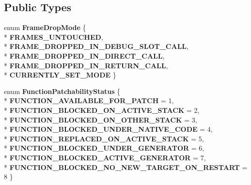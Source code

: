 \subsection*{Public Types}
\begin{DoxyCompactItemize}
\item 
enum {\bfseries Frame\+Drop\+Mode} \{ \\*
{\bfseries F\+R\+A\+M\+E\+S\+\_\+\+U\+N\+T\+O\+U\+C\+H\+ED}, 
\\*
{\bfseries F\+R\+A\+M\+E\+\_\+\+D\+R\+O\+P\+P\+E\+D\+\_\+\+I\+N\+\_\+\+D\+E\+B\+U\+G\+\_\+\+S\+L\+O\+T\+\_\+\+C\+A\+LL}, 
\\*
{\bfseries F\+R\+A\+M\+E\+\_\+\+D\+R\+O\+P\+P\+E\+D\+\_\+\+I\+N\+\_\+\+D\+I\+R\+E\+C\+T\+\_\+\+C\+A\+LL}, 
\\*
{\bfseries F\+R\+A\+M\+E\+\_\+\+D\+R\+O\+P\+P\+E\+D\+\_\+\+I\+N\+\_\+\+R\+E\+T\+U\+R\+N\+\_\+\+C\+A\+LL}, 
\\*
{\bfseries C\+U\+R\+R\+E\+N\+T\+L\+Y\+\_\+\+S\+E\+T\+\_\+\+M\+O\+DE}
 \}\hypertarget{classv8_1_1internal_1_1_live_edit_a724dd57efc0973924e2a4e2201c1285d}{}\label{classv8_1_1internal_1_1_live_edit_a724dd57efc0973924e2a4e2201c1285d}

\item 
enum {\bfseries Function\+Patchability\+Status} \{ \\*
{\bfseries F\+U\+N\+C\+T\+I\+O\+N\+\_\+\+A\+V\+A\+I\+L\+A\+B\+L\+E\+\_\+\+F\+O\+R\+\_\+\+P\+A\+T\+CH} = 1, 
\\*
{\bfseries F\+U\+N\+C\+T\+I\+O\+N\+\_\+\+B\+L\+O\+C\+K\+E\+D\+\_\+\+O\+N\+\_\+\+A\+C\+T\+I\+V\+E\+\_\+\+S\+T\+A\+CK} = 2, 
\\*
{\bfseries F\+U\+N\+C\+T\+I\+O\+N\+\_\+\+B\+L\+O\+C\+K\+E\+D\+\_\+\+O\+N\+\_\+\+O\+T\+H\+E\+R\+\_\+\+S\+T\+A\+CK} = 3, 
\\*
{\bfseries F\+U\+N\+C\+T\+I\+O\+N\+\_\+\+B\+L\+O\+C\+K\+E\+D\+\_\+\+U\+N\+D\+E\+R\+\_\+\+N\+A\+T\+I\+V\+E\+\_\+\+C\+O\+DE} = 4, 
\\*
{\bfseries F\+U\+N\+C\+T\+I\+O\+N\+\_\+\+R\+E\+P\+L\+A\+C\+E\+D\+\_\+\+O\+N\+\_\+\+A\+C\+T\+I\+V\+E\+\_\+\+S\+T\+A\+CK} = 5, 
\\*
{\bfseries F\+U\+N\+C\+T\+I\+O\+N\+\_\+\+B\+L\+O\+C\+K\+E\+D\+\_\+\+U\+N\+D\+E\+R\+\_\+\+G\+E\+N\+E\+R\+A\+T\+OR} = 6, 
\\*
{\bfseries F\+U\+N\+C\+T\+I\+O\+N\+\_\+\+B\+L\+O\+C\+K\+E\+D\+\_\+\+A\+C\+T\+I\+V\+E\+\_\+\+G\+E\+N\+E\+R\+A\+T\+OR} = 7, 
\\*
{\bfseries F\+U\+N\+C\+T\+I\+O\+N\+\_\+\+B\+L\+O\+C\+K\+E\+D\+\_\+\+N\+O\+\_\+\+N\+E\+W\+\_\+\+T\+A\+R\+G\+E\+T\+\_\+\+O\+N\+\_\+\+R\+E\+S\+T\+A\+RT} = 8
 \}\hypertarget{classv8_1_1internal_1_1_live_edit_a06d3bb41b3481e311a84e0c27c40a527}{}\label{classv8_1_1internal_1_1_live_edit_a06d3bb41b3481e311a84e0c27c40a527}

\end{DoxyCompactItemize}
